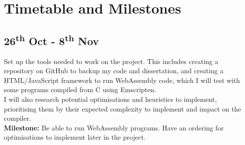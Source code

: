 \documentclass[12pt]{article}
\begin{document}
\begin{itemize}

\end{itemize}

\section*{Timetable and Milestones}
\subsection*{26\textsuperscript{th} Oct - 8\textsuperscript{th} Nov}%
Set up the tools needed to work on the project. This includes creating a repository on GitHub to backup my code and dissertation, and creating a HTML/JavaScript framework to run WebAssembly code, which I will test with some programs compiled from C using Emscripten.\\ %
I will also research potential optimisations and heuristics to implement, prioritising them by their expected complexity to implement and impact on the compiler. \\
\textbf{Milestone: }%
Be able to run WebAssembly programs. Have an ordering for optimisations to implement later in the project.
\end{document}
